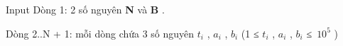 Input
Dòng 1: 2 số nguyên   \textbf{    N   }   và   \textbf{    B   }   .  

   Dòng 2..N + 1: mỗi dòng chứa 3 số nguyên   \textbf{    $t_{i}$}   ,   \textbf{    $a_{i}$}   ,   \textbf{    $b_{i}$}   (1 ≤   \textbf{    $t_{i}$}   ,   \textbf{    $a_{i}$}   ,   \textbf{    $b_{i}$}   ≤ $10^{5}$   )
